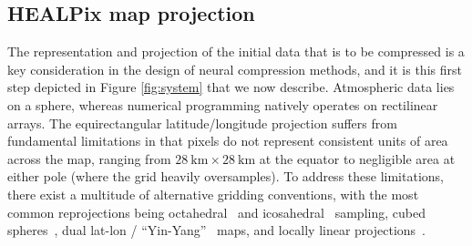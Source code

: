 \subsection{HEALPix map projection}

The representation and projection of the initial data that is to be compressed is a key consideration in the design of neural compression methods, and it is this first step depicted in Figure \ref{fig:system} that we now describe. 
Atmospheric data lies on a sphere, whereas numerical programming natively operates on rectilinear arrays. 
The equirectangular latitude/longitude projection suffers from fundamental limitations in that pixels do not represent consistent units of area across the map, ranging from $28~\text{km} \times 28~\text{km}$ at the equator to negligible area at either pole (where the grid heavily oversamples).
To address these limitations, there exist a multitude of alternative gridding conventions, with the most common reprojections being octahedral~\citep{smolarkiewicz2016fvm} and icosahedral~\citep{zangl2015icon} sampling, cubed spheres~\citep{lin1997cubedsphere,ronchi1996cubed}, dual lat-lon / ``Yin-Yang''~\citep{cote1998gem,ohno2009visualization} maps, and locally linear projections~\citep{metoffice2016data}.



